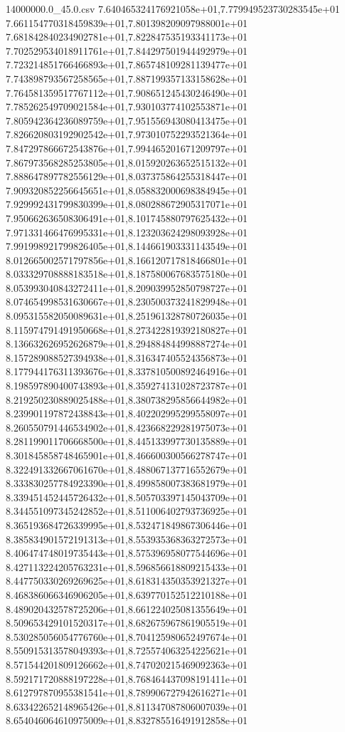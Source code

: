 \begin{filecontents*}{14000000.0_45.0.csv}
7.640465324176921058e+01,7.779949523730283545e+01
7.661154770318459839e+01,7.801398209097988001e+01
7.681842840234902781e+01,7.822847535193341173e+01
7.702529534018911761e+01,7.844297501944492979e+01
7.723214851766466893e+01,7.865748109281139477e+01
7.743898793567258565e+01,7.887199357133158628e+01
7.764581359517767112e+01,7.908651245430246490e+01
7.785262549709021584e+01,7.930103774102553871e+01
7.805942364236089759e+01,7.951556943080413475e+01
7.826620803192902542e+01,7.973010752293521364e+01
7.847297866672543876e+01,7.994465201671209797e+01
7.867973568285253805e+01,8.015920263652515132e+01
7.888647897782556129e+01,8.037375864255318447e+01
7.909320852256645651e+01,8.058832000698384945e+01
7.929992431799830399e+01,8.080288672905317071e+01
7.950662636508306491e+01,8.101745880797625432e+01
7.971331466476995331e+01,8.123203624298093928e+01
7.991998921799826405e+01,8.144661903331143549e+01
8.012665002571797856e+01,8.166120717818466801e+01
8.033329708888183518e+01,8.187580067683575180e+01
8.053993040843272411e+01,8.209039952850798727e+01
8.074654998531630667e+01,8.230500373241829948e+01
8.095315582050089631e+01,8.251961328780726035e+01
8.115974791491950668e+01,8.273422819392180827e+01
8.136632626952626879e+01,8.294884844998887274e+01
8.157289088527394938e+01,8.316347405524356873e+01
8.177944176311393676e+01,8.337810500892464916e+01
8.198597890400743893e+01,8.359274131028723787e+01
8.219250230889025488e+01,8.380738295856644982e+01
8.239901197872438843e+01,8.402202995299558097e+01
8.260550791446534902e+01,8.423668229281975073e+01
8.281199011706668500e+01,8.445133997730135889e+01
8.301845858748465901e+01,8.466600300566278747e+01
8.322491332667061670e+01,8.488067137716552679e+01
8.333830257784923390e+01,8.499858007383681979e+01
8.339451452445726432e+01,8.505703397145043709e+01
8.344551097345242852e+01,8.511006402793736925e+01
8.365193684726339995e+01,8.532471849867306446e+01
8.385834901572191313e+01,8.553935368363272573e+01
8.406474748019735443e+01,8.575396958077544696e+01
8.427113224205763231e+01,8.596856618809215433e+01
8.447750330269269625e+01,8.618314350353921327e+01
8.468386066346906205e+01,8.639770152512210188e+01
8.489020432578725206e+01,8.661224025081355649e+01
8.509653429101520317e+01,8.682675967861905519e+01
8.530285056054776760e+01,8.704125980652497674e+01
8.550915313578049393e+01,8.725574063254225621e+01
8.571544201809126662e+01,8.747020215469092363e+01
8.592171720888197228e+01,8.768464437098191411e+01
8.612797870955381541e+01,8.789906727942616271e+01
8.633422652148965426e+01,8.811347087806007039e+01
8.654046064610975009e+01,8.832785516491912858e+01

\end{filecontents*}
